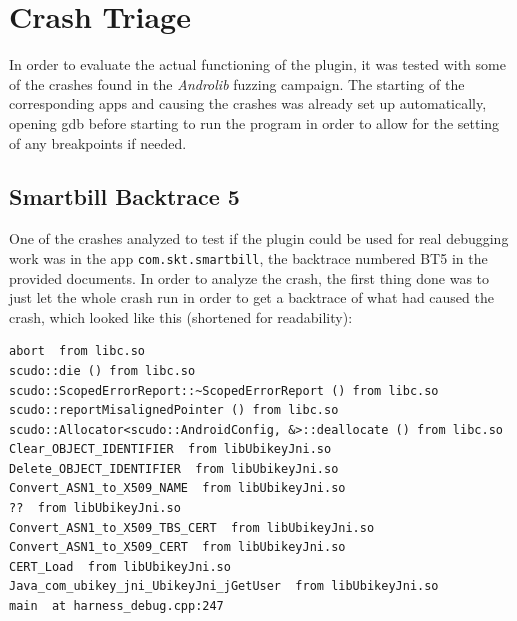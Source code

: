 \documentclass[a4paper,11pt,oneside]{report}
\begin{document}
\section{Crash Triage}

In order to evaluate the actual functioning of the plugin, it was tested with
some of the crashes found in the \textit{Androlib} fuzzing campaign. 
The starting of the corresponding
apps and causing the crashes was already set up automatically, opening gdb
before starting to run the program in order to allow for the setting of any
breakpoints if needed.

\subsection{Smartbill Backtrace 5}

One of the crashes analyzed to test if the plugin could be used for real
debugging work was in the app \verb|com.skt.smartbill|, the backtrace numbered
BT5 in the provided documents. In order to analyze the crash, the first thing
done was to just let the whole crash run in order to get a backtrace of what
had caused the crash, which looked like this (shortened for readability):


\begin{verbatim}
abort  from libc.so
scudo::die () from libc.so
scudo::ScopedErrorReport::~ScopedErrorReport () from libc.so
scudo::reportMisalignedPointer () from libc.so
scudo::Allocator<scudo::AndroidConfig, &>::deallocate () from libc.so
Clear_OBJECT_IDENTIFIER  from libUbikeyJni.so
Delete_OBJECT_IDENTIFIER  from libUbikeyJni.so
Convert_ASN1_to_X509_NAME  from libUbikeyJni.so
??  from libUbikeyJni.so
Convert_ASN1_to_X509_TBS_CERT  from libUbikeyJni.so
Convert_ASN1_to_X509_CERT  from libUbikeyJni.so
CERT_Load  from libUbikeyJni.so
Java_com_ubikey_jni_UbikeyJni_jGetUser  from libUbikeyJni.so
main  at harness_debug.cpp:247
\end{verbatim}
\end{document}
